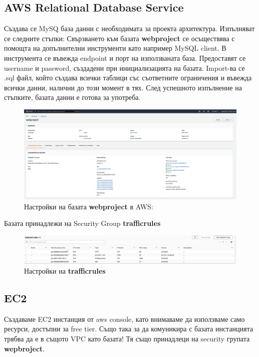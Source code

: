 \documentclass[12pt]{article}
\begin{document}
\subsection{AWS Relational Database Service}
Създава се MySQ база данни с необходимата за проекта архитектура. Изпълняват се следните стъпки:
Свързването към базата \textbf{webproject} се осъществява с помощта на допълнителни инструменти като например MySQL client. В инструмента се въвежда endpoint и порт на използваната база. Предоставят се username и password, създадени при инициализацията на базата. Import-ва се .sql файл, който създава всички таблици със съответните ограничения и въвежда всички данни, налични до този момент в тях. След успешното изпълнение на стъпките, базата данни е готова за употреба.
\begin{figure}[!htb]
    \centering
        \includegraphics[scale=0.15]{81908_fig1.png}
    \caption{Настройки на базата \textbf{webproject} в AWS:}
\end{figure}
    
    \noindent  
    
Базата принадлежи на Security Group \textbf{trafficrules} 
\bigskip
\begin{figure}
\centering
        \includegraphics[scale=0.21]{81908_fig2.png}
        \caption{Настройки на \textbf{trafficrules}}
\end{figure}
\subsection{EC2}
Създаваме EC2 инстанция от aws console, като внимаваме да използваме само ресурси, достъпни за free tier. Също така за да комуникира с базата инстанцията трябва да е в същото VPC като базата! Тя също принадлеци на security групата \textbf{wepbroject}.
\end{document}
